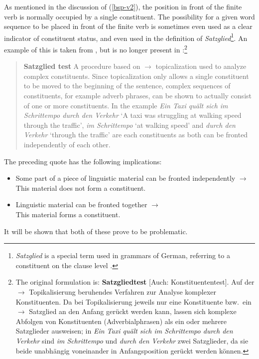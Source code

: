 As mentioned in the discussion of (\ref{bsp-v2}), the position in front of the finite verb is normally occupied
by a single constituent. The possibility for a given word sequence to be placed in front of the finite verb is sometimes even used as
a clear indicator of constituent status, and even used in the definition of
\emph{Satzglied}\footnote{%
  \emph{Satzglied} is a special term used in grammars of German, referring to a constituent on
  the clause level \citep[]{Duden2005-Authors}. 
}.
An example of this is taken from , but is no longer present in
:\footnote{%
The original formulation is: \textbf{Satzgliedtest} [Auch: Konstituententest]. Auf der $\to$ Topikalisierung
beruhendes Verfahren zur Analyse komplexer Konstituenten. Da bei Topikalisierung
jeweils nur eine Konstituente bzw.\ ein $\to$ Satzglied an den Anfang gerückt werden kann,
lassen sich komplexe Abfolgen von Konstituenten (\zb Adverbialphrasen) als
ein oder mehrere Satzglieder ausweisen; in \textit{Ein Taxi quält sich im Schrittempo
durch den Verkehr} sind \textit{im Schrittempo} und \textit{durch den Verkehr}
zwei Satzglieder, da sie beide unabhängig voneinander in Anfangsposition gerückt werden
können.%
}
\begin{quote}
\textbf{Satzglied test} A procedure based on $\to$ topicalization used to analyze complex constituents.
Since topicalization only allows a single constituent to be moved to the beginning of the sentence, complex sequences of
constituents, for example adverb phrases, can be shown to actually consist of one or more constituents. In the example
\textit{Ein Taxi quält sich im Schrittempo durch den Verkehr} `A taxi was struggling at walking speed through the traffic', \textit{im Schrittempo} 
`at walking speed' and \textit{durch den Verkehr} `through the traffic' are each constituents as both can be fronted independently of each 
other. \citep[]{Bussmann83a}
\end{quote}

\noindent
The preceding quote has the following implications:
\begin{itemize}
\item Some part of a piece of linguistic material can be fronted independently $\to$\\
	  This material does not form a constituent.
\item Linguistic material can be fronted together $\to$\\
	  This material forms a constituent.
\end{itemize}
It will be shown that both of these prove to be problematic.

